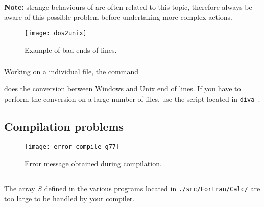 \textbf{Note:} strange behaviours of \diva are often related to this topic, therefore always be aware of this possible problem before undertaking more complex actions.

\begin{figure}[htpb]
\centering
\texttt{[image: dos2unix]}
\caption{Example of bad ends of lines.\label{fig:error_dos2unix2}}
\end{figure}


\subsubsection{\answer}

Working on a individual file, the command\\


does the conversion between Windows and Unix end of lines.
If you have to perform the conversion on a large number of files, use the script  located in \texttt{diva-\divaversion}.



\subsection{Compilation problems\label{sec:error_compile}}


\begin{figure}[htpb]
\centering
\texttt{[image: error\_compile\_g77]}
\caption{Error message obtained during compilation. \label{fig:error_compile}}
\end{figure}

\subsection{\question}

The array $S$ defined in the various programs located in \texttt{./src/Fortran/Calc/} are too large to be handled by your compiler. 


\subsubsection{\answer}

